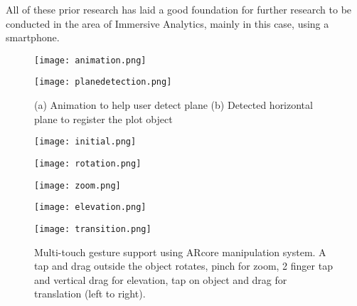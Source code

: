 \documentclass[journal]{vgtc}                %
\begin{document}
All of these prior research has laid a good foundation for further research to be conducted in the area of Immersive Analytics, mainly in this case, using a smartphone.

\begin{figure}[ht]
    \begin{minipage}[b]{0.45\linewidth}
        \centering
        \texttt{[image: animation.png]}
        \subcaption{}
    \end{minipage}
    \hspace{0.5cm}
    \begin{minipage}[b]{0.45\linewidth}
        \centering
        \texttt{[image: planedetection.png]}
       \subcaption{}
    \end{minipage}
    \caption{(a) Animation to help user detect plane (b) Detected horizontal plane to register the plot object}
\end{figure}

\begin{figure*}
\begin{multicols}{5}
    \begin{minipage}[b]{\linewidth}
    \texttt{[image: initial.png]}\par 
    \end{minipage}
    
    \begin{minipage}[b]{\linewidth}
    \texttt{[image: rotation.png]}\par 
    \end{minipage}
    
    \begin{minipage}[b]{\linewidth}
    \texttt{[image: zoom.png]}\par
    \end{minipage}
        
    \begin{minipage}[b]{\linewidth}
    \texttt{[image: elevation.png]}\par
    \end{minipage}
        \begin{minipage}[b]{\linewidth}
    \texttt{[image: transition.png]}\par
    \end{minipage}
\end{multicols}
\caption{Multi-touch gesture support using ARcore manipulation system. A tap and drag outside the object rotates, pinch for zoom, 2 finger tap and vertical drag for elevation, tap on object and drag for translation (left to right).}
\end{figure*}
\end{document}
